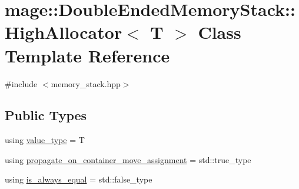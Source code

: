 \hypertarget{classmage_1_1_double_ended_memory_stack_1_1_high_allocator}{}\section{mage\+:\+:Double\+Ended\+Memory\+Stack\+:\+:High\+Allocator$<$ T $>$ Class Template Reference}
\label{classmage_1_1_double_ended_memory_stack_1_1_high_allocator}


{\ttfamily \#include $<$memory\+\_\+stack.\+hpp$>$}

\subsection*{Public Types}
\begin{DoxyCompactItemize}
\item 
using \mbox{\hyperlink{classmage_1_1_double_ended_memory_stack_1_1_high_allocator_aa1286d55a0e3d5a8cf281d5d29b0f058}{value\+\_\+type}} = T
\item 
using \mbox{\hyperlink{classmage_1_1_double_ended_memory_stack_1_1_high_allocator_a56caf83353fdcc547233d5b2169c897c}{propagate\+\_\+on\+\_\+container\+\_\+move\+\_\+assignment}} = std\+::true\+\_\+type
\item 
using \mbox{\hyperlink{classmage_1_1_double_ended_memory_stack_1_1_high_allocator_a81c407c8c9e727ce05fc86cf9e674104}{is\+\_\+always\+\_\+equal}} = std\+::false\+\_\+type
\end{DoxyCompactItemize}
